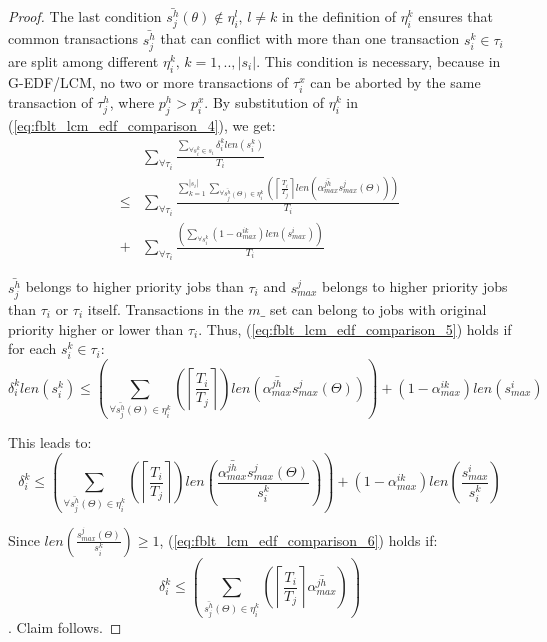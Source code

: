 \documentclass[prodmode,acmtecs]{acmsmall}
\begin{document}
\begin{proof}
The last condition $\bar{s_{j}^{h}}(\theta)\not\in\eta_{i}^{l},\, l\ne k$
in the definition of $\eta_{i}^{k}$ ensures that common transactions
$\bar{s_{j}^{h}}$ that can conflict with more than one transaction
$s_{i}^{k}\in\tau_{i}$ are split among different $\eta_{i}^{k},\, k=1,..,|s_{i}|$.
This condition is necessary, because in G-EDF/LCM, no two or more transactions
of $\tau_{i}^{x}$ can be aborted by the same transaction of $\tau_{j}^{h}$, 
where $p_{j}^{h}>p_{i}^{x}$. By substitution of $\eta_{i}^{k}$ in
(\ref{eq:fblt_lcm_edf_comparison_4}), we get:  
\begin{eqnarray}
 & \sum_{\forall\tau_{i}}\frac{\sum_{\forall s_{i}^{k}\in s_{i}}\delta_i^klen(s_{i}^{k})}{T_{i}}\label{eq:fblt_lcm_edf_comparison_5}\\
\le & \sum_{\forall\tau_{i}}\frac{\sum_{k=1}^{|s_{i}|}\sum_{\forall\bar{s_{j}^{h}}(\Theta)\in\eta_{i}^{k}}\left(\left\lceil \frac{T_{i}}{T_{j}}\right\rceil len\left(\bar{\alpha_{max}^{jh}}s_{max}^{j}(\Theta)\right)\right)}{T_{i}}\nonumber \\
+ & \sum_{\forall\tau_{i}}\frac{\left(\sum_{\forall s_{i}^{k}}\left(1-\alpha_{max}^{ik}\right)len\left(s_{max}^{i}\right)\right)}{T_{i}}\nonumber 
\end{eqnarray}

$\bar{s_{j}^{h}}$ belongs to higher priority jobs than $\tau_{i}$
and $s_{max}^{j}$ belongs to higher priority jobs than $\tau_{i}$
or $\tau_{i}$ itself. Transactions in the $m\_$ set can belong to jobs
with original priority higher or lower than $\tau_{i}$. Thus, (\ref{eq:fblt_lcm_edf_comparison_5})
holds if for each $s_{i}^{k}\in\tau_{i}$: 
\[
\delta_i^klen(s_{i}^{k})\le\left(\sum_{\forall\bar{s_{j}^{h}}(\Theta)\in\eta_{i}^{k}}\left(\left\lceil \frac{T_{i}}{T_{j}}\right\rceil \right)len\left(\bar{\alpha_{max}^{jh}}s_{max}^{j}(\Theta)\right)\right)+\left(1-\alpha_{max}^{ik}\right)len\left(s_{max}^{i}\right)
\]

This leads to:
\begin{equation}
\delta_i^k\le\left(\sum_{\forall\bar{s_{j}^{h}}(\Theta)\in\eta_{i}^{k}}\left(\left\lceil \frac{T_{i}}{T_{j}}\right\rceil \right)len\left(\frac{\bar{\alpha_{max}^{jh}}s_{max}^{j}(\Theta)}{s_{i}^{k}}\right)\right)+\left(1-\alpha_{max}^{ik}\right)len\left(\frac{s_{max}^{i}}{s_{i}^{k}}\right)\label{eq:fblt_lcm_edf_comparison_6}
\end{equation}

Since $len\left(\frac{s_{max}^{j}(\Theta)}{s_{i}^{k}}\right)\ge1$, (\ref{eq:fblt_lcm_edf_comparison_6}) holds if: 
\begin{equation*}
\delta_i^k\le\left(\sum_{\bar{s_{j}^{h}}(\Theta)\in\eta_{i}^{k}}\left(\left\lceil \frac{T_{i}}{T_{j}}\right\rceil \bar{\alpha_{max}^{jh}}\right)\right)
\end{equation*}. Claim follows.
\end{proof}
\end{document}
